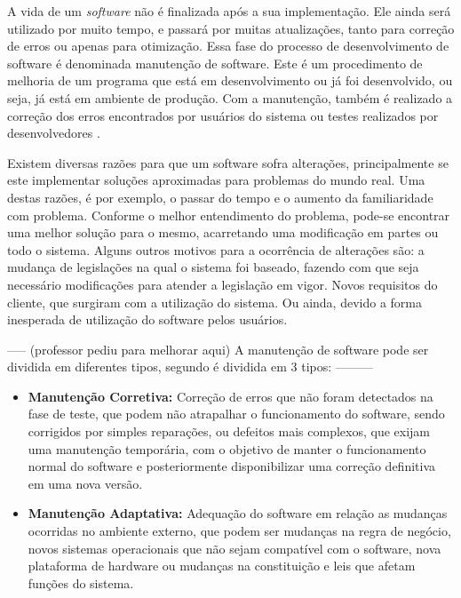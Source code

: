 A vida de um \textit{software} não é finalizada após a sua implementação. Ele ainda será utilizado por muito tempo, e passará por muitas atualizações, tanto para correção de erros ou apenas para otimização. Essa fase do processo de desenvolvimento de software é denominada manutenção de software. Este é um procedimento de melhoria de um programa que está em desenvolvimento ou já foi desenvolvido, ou seja, já está em ambiente de produção. Com a manutenção, também é realizado a correção dos erros encontrados por usuários do sistema ou testes realizados por desenvolvedores \cite{rodrigoSpinola2011}.

Existem diversas razões para que um software sofra alterações, principalmente se este implementar soluções aproximadas para problemas do mundo real. Uma destas razões, é por exemplo, o passar do tempo e o aumento da familiaridade com problema. Conforme o melhor entendimento do problema, pode-se encontrar uma melhor solução para o mesmo, acarretando uma modificação em partes ou todo o sistema. Alguns outros motivos para a ocorrência de alterações são: a mudança de legislações na qual o sistema foi baseado, fazendo com que seja necessário modificações para atender a legislação em vigor. Novos requisitos do cliente, que surgiram com a utilização do sistema. Ou ainda, devido a forma inesperada de utilização do software pelos usuários.

----- (professor pediu para melhorar aqui) A manutenção de software pode ser dividida em diferentes tipos, segundo \cite{iansommerville} é dividida em 3 tipos: ---------


\begin{itemize}
    \item \textbf{Manutenção Corretiva:} Correção de erros que não foram detectados na fase de teste, que podem não atrapalhar o funcionamento do software, sendo corrigidos por simples reparações, ou defeitos mais complexos, que exijam uma manutenção temporária, com o objetivo de manter o funcionamento normal do software e posteriormente disponibilizar uma correção definitiva em uma nova versão. 
\end{itemize}
    
\begin{itemize}  
    \item \textbf{Manutenção Adaptativa:} Adequação do software em relação as mudanças ocorridas no ambiente externo, que podem ser mudanças na regra de negócio, novos sistemas operacionais que não sejam compatível com o software, nova plataforma de hardware ou mudanças na constituição e leis que afetam funções do sistema.
\end{itemize}
    
